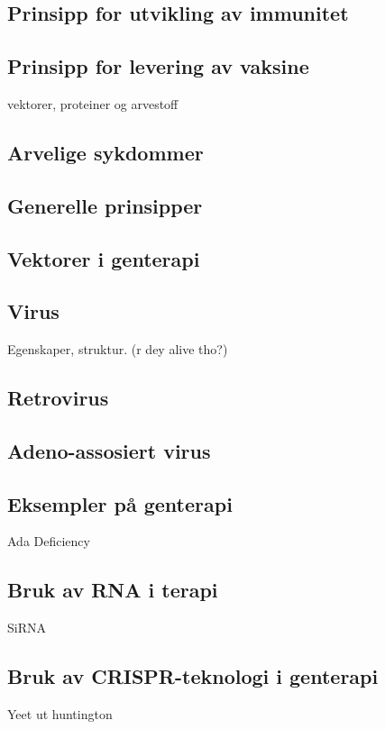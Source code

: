 \subsection{Prinsipp for utvikling av immunitet}

\subsection{Prinsipp for levering av vaksine}
    vektorer, proteiner og arvestoff

\subsection{Arvelige sykdommer}

\subsection{Generelle prinsipper}

\subsection{Vektorer i genterapi}

\subsection{Virus}
    Egenskaper, struktur. (r dey alive tho?)

\subsection{Retrovirus}

\subsection{Adeno-assosiert virus}

\subsection{Eksempler på genterapi}
    Ada Deficiency

\subsection{Bruk av RNA i terapi}
    SiRNA

\subsection{Bruk av CRISPR-teknologi i genterapi}
    Yeet ut huntington
